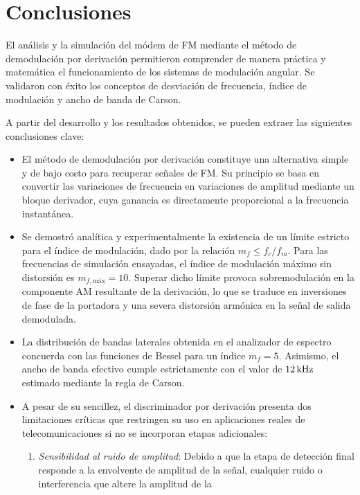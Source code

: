 \chapter{Conclusiones}
\label{sec.ej2:conclusiones}

El análisis y la simulación del módem de FM mediante el método de demodulación por derivación permitieron comprender
de manera práctica y matemática el funcionamiento de los sistemas de modulación angular. Se validaron con éxito los
conceptos de desviación de frecuencia, índice de modulación y ancho de banda de Carson.

A partir del desarrollo y los resultados obtenidos, se pueden extraer las siguientes conclusiones clave:
\begin{itemize}
    \item El método de demodulación por derivación constituye una alternativa simple y de bajo costo para recuperar
          señales de FM. Su principio se basa en convertir las variaciones de frecuencia en variaciones de amplitud
          mediante un bloque derivador, cuya ganancia es directamente proporcional a la frecuencia instantánea.
    \item Se demostró analítica y experimentalmente la existencia de un límite estricto para el índice de modulación,
          dado por la relación $m_f \le f_c / f_m$. Para las frecuencias de simulación ensayadas, el índice de
          modulación máximo sin distorsión es $m_{f,\text{máx}} = 10$. Superar dicho límite provoca sobremodulación
          en la componente AM resultante de la derivación, lo que se traduce en inversiones de fase de la portadora
          y una severa distorsión armónica en la señal de salida demodulada.
    \item La distribución de bandas laterales obtenida en el analizador de espectro concuerda con las funciones de
          Bessel para un índice $m_f = 5$. Asimismo, el ancho de banda efectivo cumple estrictamente con el valor
          de $12\,\mathrm{kHz}$ estimado mediante la regla de Carson.
    \item A pesar de su sencillez, el discriminador por derivación presenta dos limitaciones críticas que restringen
          su uso en aplicaciones reales de telecomunicaciones si no se incorporan etapas adicionales:
          \begin{enumerate}
              \item \emph{Sensibilidad al ruido de amplitud}: Debido a que la etapa de detección final responde a la
                    envolvente de amplitud de la señal, cualquier ruido o interferencia que altere la amplitud de la

\end{enumerate}
\end{itemize}
